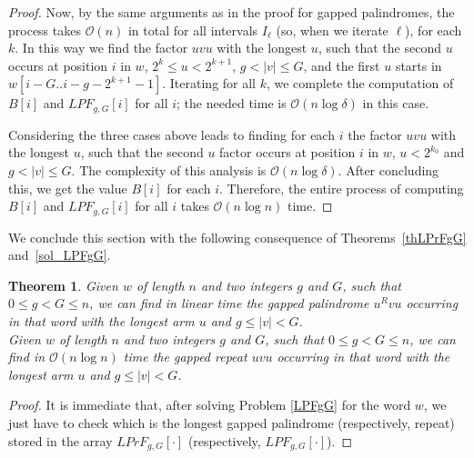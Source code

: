 \documentclass[final]{dmtcs-episciences}
\newcommand{\bigo}{{\mathcal O}}
\newcommand{\LPdF}{{\mathit{LPF}}}
\newtheorem{theorem}{Theorem}
\begin{document}
\begin{proof}
Now, by the same arguments as in the proof for gapped palindromes, the process takes $\bigo(n)$ in total for all intervals $I_\ell$ (so, when we iterate $\ell$), for each $k$. In this way we find the factor $uvu$ with the longest $u$, such that the second $u$ occurs at position $i$ in $w$, $2^k \leq u<  2^{k+1}$, $g<|v|\leq G$, and the first $u$ starts in $w[i-G..i-g-2^{k+1}-1]$. Iterating for all $k$, we complete the computation of $B[i]$ and $\LPdF_{g,G}[i]$ for all $i$; the needed time is $\bigo(n\log \delta)$ in this case.

Considering the three cases above leads to finding for each $i$ the factor $uvu$ with the longest $u$, such that the second $u$ factor occurs at position $i$ in $w$, $u<  2^{k_0}$ and $g<|v|\leq G$. The complexity of this analysis is $\bigo(n\log \delta)$. After concluding this, we get the value $B[i]$ for each $i$. Therefore, the entire process of computing $B[i]$ and $\LPdF_{g,G}[i]$ for all $i$ takes $\bigo(n\log n)$ time.
\end{proof}

We conclude this section with the following consequence of Theorems~\ref{thLPrFgG} and~\ref{sol_LPFgG}.

\begin{theorem}
Given $w$ of length $n$ and two integers $g$ and $G$, such that $0\leq g< G\leq n$, we can find in linear time the gapped palindrome $u^Rvu$ occurring in that word with the longest arm $u$ and $g\leq |v|<G$.\\
Given $w$ of length $n$ and two integers $g$ and $G$, such that $0\leq g< G\leq n$, we can find in $\bigo(n \log n)$ time the gapped repeat $uvu$ occurring in that word with the longest arm $u$ and $g\leq |v|<G$.
\end{theorem}
\begin{proof}
It is immediate that, after solving Problem \ref{LPFgG} for the word $w$, we just have to check which is the longest gapped palindrome (respectively, repeat) stored in the array $LPrF_{g,G}[\cdot]$ (respectively, $\LPdF_{g,G}[\cdot]$). 
 \end{proof}
\end{document}
